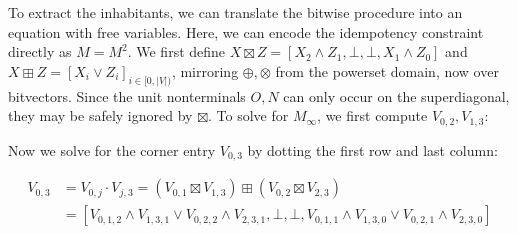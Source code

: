 \documentclass[runningheads]{llncs}
\begin{document}

  To extract the inhabitants, we can translate the bitwise procedure into an equation with free variables. Here, we can encode the idempotency constraint directly as $M = M^2$. We first define $X \boxtimes Z = [X_2 \land Z_1, \bot, \bot, X_1 \land Z_0]$ and $X \boxplus Z = [X_i \lor Z_i]_{i \in [0, |V|)}$, mirroring $\oplus, \otimes$ from the powerset domain, now over bitvectors. Since the unit nonterminals $O, N$ can only occur on the superdiagonal, they may be safely ignored by $\boxtimes$. To solve for $M_\infty$, we first compute $V_{0, 2}, V_{1, 3}$:

\hspace{-0.5cm}

  \noindent Now we solve for the corner entry $V_{0, 3}$ by dotting the first row and last column:\vspace{-8pt}

  \begin{align*}
    V_{0, 3} &= V_{0, j} \cdot V_{j, 3} = (V_{0, 1} \boxtimes V_{1, 3}) \boxplus (V_{0, 2} \boxtimes V_{2, 3})\\
    &= [V_{0, 1, 2} \land V_{1, 3, 1} \lor V_{0, 2, 2} \land V_{2, 3, 1}, \bot, \bot, V_{0, 1, 1} \land V_{1, 3, 0} \lor V_{0, 2, 1} \land V_{2, 3, 0}]
  \end{align*}
\end{document}
